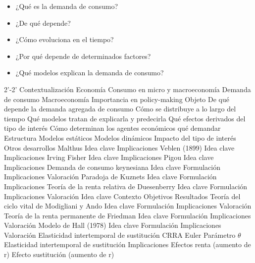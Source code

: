 \documentclass{nuevotema}
\begin{document}
\begin{itemize}
    \item ¿Qué es la demanda de consumo?
    \item ¿De qué depende?
    \item ¿Cómo evoluciona en el tiempo?
    \item ¿Por qué depende de determinados factores?
    \item ¿Qué modelos explican la demanda de consumo?
\end{itemize}

\esquemacorto

\begin{esquema}[enumerate]
	\1[]  2'-2'
		\2 Contextualización
			\3 Economía
			\3 Consumo en micro y macroeconomía
			\3 Demanda de consumo
			\3 Macroeconomía
			\3 Importancia en policy-making
		\2 Objeto
			\3 De qué depende la demanda agregada de consumo
			\3 Cómo se distribuye a lo largo del tiempo
			\3 Qué modelos tratan de explicarla y predecirla
			\3 Qué efectos derivados del tipo de interés
			\3 Cómo determinan los agentes económicos qué demandar
		\2 Estructura
			\3 Modelos estáticos
			\3 Modelos dinámicos
			\3 Impacto del tipo de interés
			\3 Otros desarrollos
	\1 
		\2 Malthus
			\3 Idea clave
			\3 Implicaciones
		\2 Veblen (1899)
			\3 Idea clave
			\3 Implicaciones
		\2 Irving Fisher
			\3 Idea clave
			\3 Implicaciones
		\2 Pigou
			\3 Idea clave
			\3 Implicaciones
	\1 
		\2 Demanda de consumo keynesiana
			\3 Idea clave
			\3 Formulación
			\3 Implicaciones
			\3 Valoración
		\2 Paradoja de Kuznets
			\3 Idea clave
			\3 Formulación
			\3 Implicaciones
		\2 Teoría de la renta relativa de Duesenberry
			\3 Idea clave
			\3 Formulación
			\3 Implicaciones
			\3 Valoración
	\1 
		\2 Idea clave
			\3 Contexto
			\3 Objetivos
			\3 Resultados
		\2 Teoría del ciclo vital de Modigliani y Ando
			\3 Idea clave
			\3 Formulación
			\3 Implicaciones
			\3 Valoración
		\2 Teoría de la renta permanente de Friedman
			\3 Idea clave
			\3 Formulación
			\3 Implicaciones
			\3 Valoración
		\2 Modelo de Hall (1978)
			\3 Idea clave
			\3 Formulación
			\3 Implicaciones
			\3 Valoración
	\1 
		\2 Elasticidad intertemporal de sustitución
			\3 CRRA
			\3 Euler
			\3 Parámetro $\theta$
			\3 Elasticidad intertemporal de sustitución
		\2 Implicaciones
			\3 Efectos renta (aumento de r)
			\3 Efecto sustitución (aumento de r)

\end{esquema}
\end{document}
